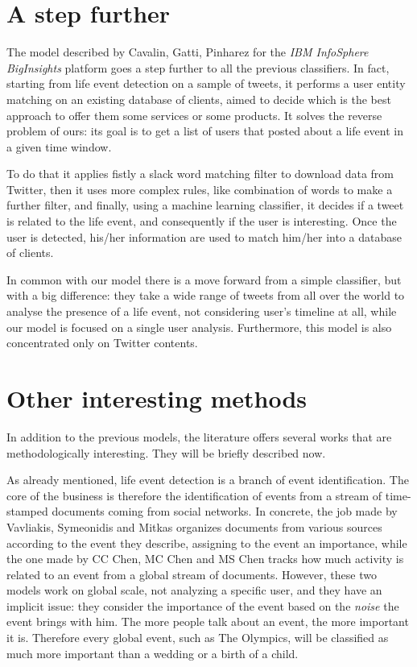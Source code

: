 \section{A step further}
\label{sec:further}
The model described by Cavalin, Gatti, Pinharez for the \textit{IBM InfoSphere BigInsights} platform \cite{cavalin2014towards} goes a step further to all the previous classifiers. In fact, starting from life event detection on a sample of tweets, it performs a user entity matching on an existing database of clients, aimed to decide which is the best approach to offer them some services or some products. It solves the reverse problem of ours: its goal is to get a list of users that posted about a life event in a given time window. 

To do that it applies fistly a slack word matching filter to download data from Twitter, then it uses more complex rules, like combination of words to make a further filter, and finally, using a machine learning classifier, it decides if a tweet is related to the life event, and consequently if the user is interesting. Once the user is detected, his/her information are used to match him/her into a database of clients.

In common with our model there is a move forward from a simple classifier, but with a big difference: they take a wide range of tweets from all over the world to analyse the presence of a life event, not considering user's timeline at all, while our model is focused on a single user analysis. Furthermore, this model is also concentrated only on Twitter contents.

\section{Other interesting methods}
\label{sec:other}
In addition to the previous models, the literature offers several works that are methodologically interesting. They will be briefly described now.

As already mentioned, life event detection is a branch of event identification. The core of the business is therefore the identification of events from a stream of time-stamped documents coming from social networks. In concrete, the job made by Vavliakis, Symeonidis and Mitkas \cite{vavliakis2013event} organizes documents from various sources according to the event they describe, assigning to the event an importance, while the one made by CC Chen, MC Chen and MS Chen \cite{chen2009adaptive} tracks how much activity is related to an event from a global stream of documents. However, these two models work on global scale, not analyzing a specific user, and they have an implicit issue: they consider the importance of the event based on the \textit{noise} the event brings with him. The more people talk about an event, the more important it is. Therefore every global event, such as The Olympics, will be classified as much more important than a wedding or a birth of a child.

